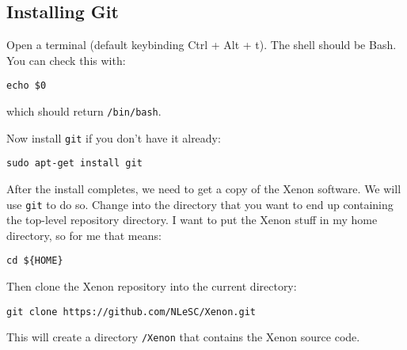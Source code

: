 \subsection{Installing Git}

Open a terminal (default keybinding Ctrl + Alt + t). The shell should be Bash. You can check this with:
\begin{lstlisting}[style=basic,style=bash]
echo $0
\end{lstlisting} %
which should return \texttt{/bin/bash}.

Now install \texttt{git} if you don't have it already:
\begin{lstlisting}[style=basic,style=bash]
sudo apt-get install git
\end{lstlisting}

After the install completes, we need to get a copy of the Xenon software. We will use \texttt{git} to do so. Change into the directory that you want to end up containing the top-level repository directory. I want to put the Xenon stuff in my home directory, so for me that means:
\begin{lstlisting}[style=basic,style=bash]
cd ${HOME}
\end{lstlisting} %
Then clone the Xenon repository into the current directory:
\begin{lstlisting}[style=basic,style=bash]
git clone https://github.com/NLeSC/Xenon.git
\end{lstlisting}
This will create a directory \texttt{\mytilde{}/Xenon} that contains the Xenon source code.
